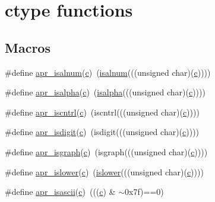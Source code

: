 \hypertarget{group__apr__ctype}{}\section{ctype functions}
\label{group__apr__ctype}
\subsection*{Macros}
\begin{DoxyCompactItemize}
\item 
\#define \hyperlink{group__apr__ctype_ga4fa78e6e7272dae64731768a17a2e003}{apr\+\_\+isalnum}(\hyperlink{pcregrep_8txt_aef720ae5f62fa015619d00171d917416}{c})~(\hyperlink{README_8txt_a25d7dd05239df8ce57a8921c43397d07}{isalnum}(((unsigned char)(\hyperlink{pcregrep_8txt_aef720ae5f62fa015619d00171d917416}{c}))))
\item 
\#define \hyperlink{group__apr__ctype_ga9ecd5b94a7816591afd68040b0624327}{apr\+\_\+isalpha}(\hyperlink{pcregrep_8txt_aef720ae5f62fa015619d00171d917416}{c})~(\hyperlink{README_8txt_a1a9982a5b5761e5270bf12839e8b1b35}{isalpha}(((unsigned char)(\hyperlink{pcregrep_8txt_aef720ae5f62fa015619d00171d917416}{c}))))
\item 
\#define \hyperlink{group__apr__ctype_gacc8b4597be99c895ea042e8088ee94ab}{apr\+\_\+iscntrl}(\hyperlink{pcregrep_8txt_aef720ae5f62fa015619d00171d917416}{c})~(iscntrl(((unsigned char)(\hyperlink{pcregrep_8txt_aef720ae5f62fa015619d00171d917416}{c}))))
\item 
\#define \hyperlink{group__apr__ctype_ga8c453b1d66015b357c3d3a3ddb7d97d7}{apr\+\_\+isdigit}(\hyperlink{pcregrep_8txt_aef720ae5f62fa015619d00171d917416}{c})~(isdigit(((unsigned char)(\hyperlink{pcregrep_8txt_aef720ae5f62fa015619d00171d917416}{c}))))
\item 
\#define \hyperlink{group__apr__ctype_gad4fbfcf508e7771ca85e85e4ac9567c2}{apr\+\_\+isgraph}(\hyperlink{pcregrep_8txt_aef720ae5f62fa015619d00171d917416}{c})~(isgraph(((unsigned char)(\hyperlink{pcregrep_8txt_aef720ae5f62fa015619d00171d917416}{c}))))
\item 
\#define \hyperlink{group__apr__ctype_gaff5eeb2f6350095ce86cc2cd4b1d38ee}{apr\+\_\+islower}(\hyperlink{pcregrep_8txt_aef720ae5f62fa015619d00171d917416}{c})~(\hyperlink{README_8txt_ad71ae719aeb3f56d11fec83b8bdd7bf5}{islower}(((unsigned char)(\hyperlink{pcregrep_8txt_aef720ae5f62fa015619d00171d917416}{c}))))
\item 
\#define \hyperlink{group__apr__ctype_gae7cab1b39d2e0fc14f343ec14e12565a}{apr\+\_\+isascii}(\hyperlink{pcregrep_8txt_aef720ae5f62fa015619d00171d917416}{c})~(((\hyperlink{pcregrep_8txt_aef720ae5f62fa015619d00171d917416}{c}) \& $\sim$0x7f)==0)

\end{DoxyCompactItemize}
